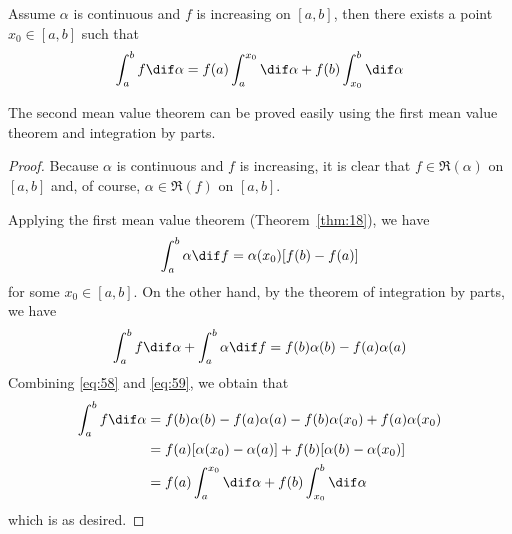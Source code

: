 \documentclass[thmcnt=section, color=blue, 12pt]{my-elegantbook}
\begin{document}
\begin{theorem} \label{thm:19}
	Assume $\alpha$ is continuous and $f$ is increasing on $[a, b]$,
	then there exists a point $x_0 \in [a, b]$ such that
	\begin{align*}
		\int_a^b f \dif \alpha
		= f(a) \int_a^{x_0} \dif \alpha + f(b) \int_{x_0}^b \dif \alpha
	\end{align*}
\end{theorem}

The second mean value theorem can be proved easily
using the first mean value theorem and integration by parts.


\begin{proof}

	Because $\alpha$ is continuous and $f$ is increasing,
	it is clear that $f \in \mathfrak{R}(\alpha)$ on $[a, b]$
	and, of course, $\alpha \in \mathfrak{R}(f)$ on $[a, b]$.

	Applying the first mean value theorem (Theorem~\ref{thm:18}),
	we have
	\begin{align}
		\int_a^b \alpha \dif f = \alpha(x_0) [f(b) - f(a)]
		\label{eq:58}
	\end{align}
	for some $x_0 \in [a, b]$.
	On the other hand, by the theorem of integration by parts, we have
	\begin{align}
		\int_a^b f \dif \alpha + \int_a^b \alpha \dif f
		= f(b) \alpha(b) - f(a) \alpha(a)
		\label{eq:59}
	\end{align}
	Combining \eqref{eq:58} and \eqref{eq:59}, we obtain that
	\begin{align*}
		\int_a^b f \dif \alpha
		 & = f(b) \alpha(b) - f(a) \alpha(a)
		- f(b) \alpha(x_0) + f(a) \alpha(x_0)                              \\
		 & = f(a)[\alpha(x_0) - \alpha(a)] + f(b)[\alpha(b) - \alpha(x_0)] \\
		 & = f(a) \int_a^{x_0} \dif \alpha + f(b) \int_{x_0}^b \dif \alpha
	\end{align*}
	which is as desired.
\end{proof}
\end{document}

